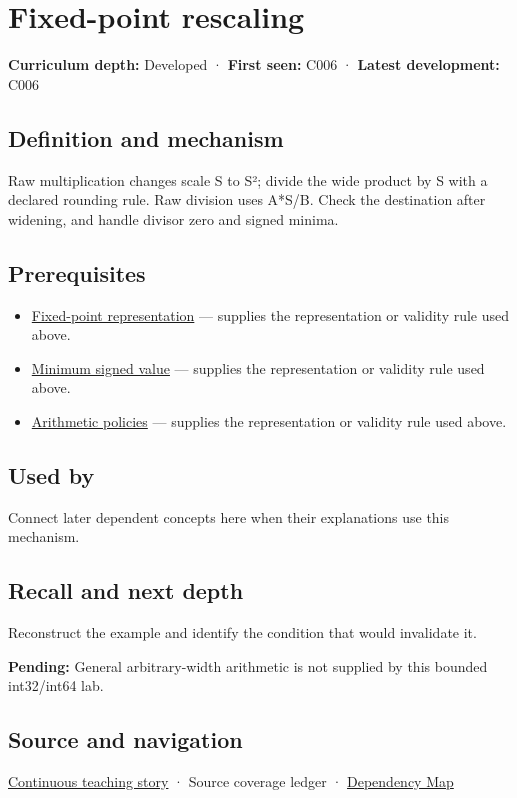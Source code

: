 \hypertarget{appendix-3333db47830f}{}\label{referencestart:appendix-3333db47830f}
\section{Fixed-point rescaling}\label{appendix-3333db47830f-fixed-point-rescaling}

\textbf{Curriculum depth:} Developed · \textbf{First seen:} C006 · \textbf{Latest development:} C006

\subsection{Definition and mechanism}\label{appendix-3333db47830f-definition-and-mechanism}

Raw multiplication changes scale S to S²; divide the wide product by S with a declared rounding rule. Raw division uses A*S/B. Check the destination after widening, and handle divisor zero and signed minima.

\subsection{Prerequisites}\label{appendix-3333db47830f-prerequisites}

\begin{itemize}
\tightlist
\item
  \hyperref[appendix-1d0dbe8924cc]{Fixed-point representation} --- supplies the representation or validity rule used above.
\item
  \hyperref[appendix-05f39b10364d]{Minimum signed value} --- supplies the representation or validity rule used above.
\item
  \hyperref[appendix-2ed044358b82]{Arithmetic policies} --- supplies the representation or validity rule used above.
\end{itemize}

\subsection{Used by}\label{appendix-3333db47830f-used-by}

Connect later dependent concepts here when their explanations use this mechanism.

\subsection{Recall and next depth}\label{appendix-3333db47830f-recall-and-next-depth}

Reconstruct the example and identify the condition that would invalidate it.

\textbf{Pending:} General arbitrary-width arithmetic is not supplied by this bounded int32/int64 lab.

\subsection{Source and navigation}\label{appendix-3333db47830f-source-and-navigation}

\hyperref[01-foundations-i-ch001-choosing-what-information-to-keep]{Continuous teaching story} · {Source coverage ledger} · \hyperref[appendix-4ad47bdd269a]{Dependency Map}
